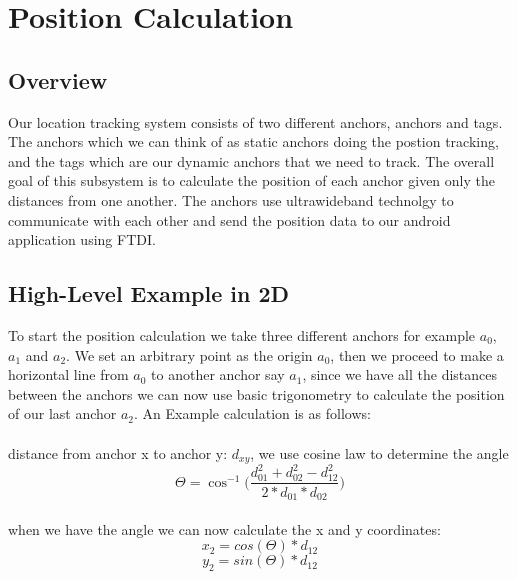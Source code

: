 
\chapter{Position Calculation} %

\label{PositionCalculation}


\section{Overview}

Our location tracking system consists of two different anchors, anchors and tags. The anchors which we can think of as static anchors doing the postion tracking, and the tags which are our dynamic anchors that we need to track. The overall goal of this subsystem is to calculate the position of each anchor given only the distances from one another.
The anchors use ultrawideband technolgy to communicate with each other and send the position data to our android application using FTDI.


\section{High-Level Example in 2D}
To start the position calculation we take three different anchors for example $a_{0}$, $ a_{1}$  and $a_{2}$. We set an arbitrary point as the origin $a_{0}$, then we proceed to make a horizontal line from $a_{0}$ to another anchor say $a_{1}$, since we have all the distances between the anchors we can now use basic trigonometry to calculate the position of our last anchor $a_{2}$.
An Example calculation is as follows:
\\\\
distance from anchor x to anchor y: $d_{xy}$, we use cosine law to determine the angle
\\
\[ \Theta = \cos ^{ - 1}\Big(\frac{d_{01}^2 + d_{02}^2 - d_{12}^2 }{2*d_{01}*d_{02}}\Big)\]
\\
when we have the angle we can now calculate the x and y coordinates:
\\
\[ x_2 = cos(\Theta) * d_{12} \]
\[ y_2 = sin(\Theta) *  d_{12} \]

